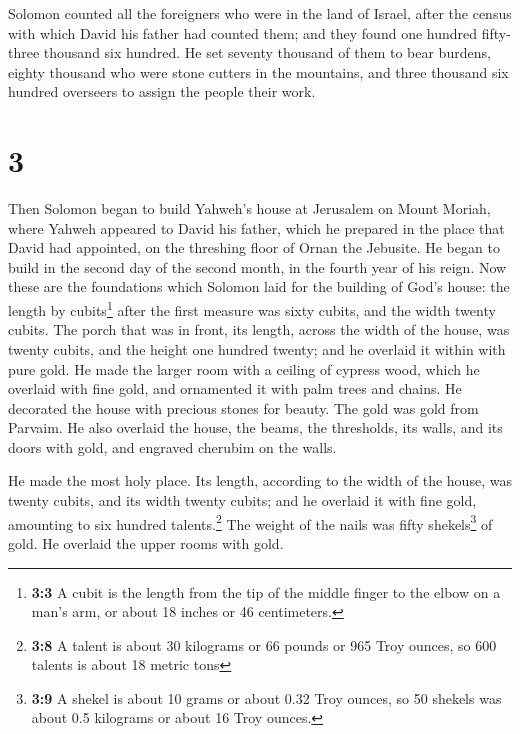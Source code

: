  Solomon counted all the foreigners who were in the land
of Israel, after the census with which David his father had counted
them; and they found one hundred fifty-three thousand six hundred.
 He set seventy thousand of them to bear burdens, eighty
thousand who were stone cutters in the mountains, and three thousand six
hundred overseers to assign the people their work.

\hypertarget{section-2}{%
\section{3}\label{section-2}}

 Then Solomon began to build Yahweh's house at Jerusalem
on Mount Moriah, where Yahweh appeared to David his father, which he
prepared in the place that David had appointed, on the threshing floor
of Ornan the Jebusite.  He began to build in the second
day of the second month, in the fourth year of his reign. 
Now these are the foundations which Solomon laid for the building of
God's house: the length by cubits\footnote{\textbf{3:3} A cubit is the
  length from the tip of the middle finger to the elbow on a man's arm,
  or about 18 inches or 46 centimeters.} after the first measure was
sixty cubits, and the width twenty cubits.  The porch that
was in front, its length, across the width of the house, was twenty
cubits, and the height one hundred twenty; and he overlaid it within
with pure gold.  He made the larger room with a ceiling of
cypress wood, which he overlaid with fine gold, and ornamented it with
palm trees and chains.  He decorated the house with
precious stones for beauty. The gold was gold from Parvaim.
 He also overlaid the house, the beams, the thresholds,
its walls, and its doors with gold, and engraved cherubim on the walls.

 He made the most holy place. Its length, according to the
width of the house, was twenty cubits, and its width twenty cubits; and
he overlaid it with fine gold, amounting to six hundred
talents.\footnote{\textbf{3:8} A talent is about 30 kilograms or 66
  pounds or 965 Troy ounces, so 600 talents is about 18 metric tons}
 The weight of the nails was fifty shekels\footnote{\textbf{3:9}
  A shekel is about 10 grams or about 0.32 Troy ounces, so 50 shekels
  was about 0.5 kilograms or about 16 Troy ounces.} of gold. He overlaid
the upper rooms with gold.

